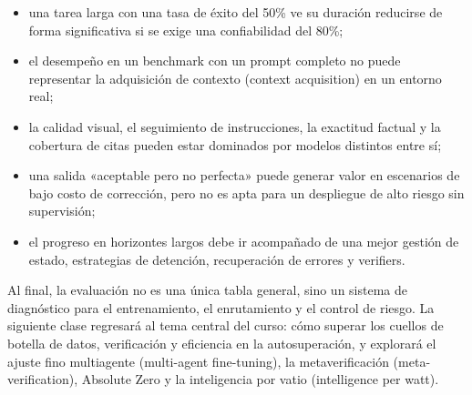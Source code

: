 \documentclass[a4paper]{article}
\begin{document}
\begin{itemize}
    \item una tarea larga con una tasa de éxito del 50\% ve su duración reducirse de forma significativa si se exige una confiabilidad del 80\%;
    \item el desempeño en un benchmark con un prompt completo no puede representar la adquisición de contexto (context acquisition) en un entorno real;
    \item la calidad visual, el seguimiento de instrucciones, la exactitud factual y la cobertura de citas pueden estar dominados por modelos distintos entre sí;
    \item una salida «aceptable pero no perfecta» puede generar valor en escenarios de bajo costo de corrección, pero no es apta para un despliegue de alto riesgo sin supervisión;
    \item el progreso en horizontes largos debe ir acompañado de una mejor gestión de estado, estrategias de detención, recuperación de errores y verifiers.
\end{itemize}

Al final, la evaluación no es una única tabla general, sino un sistema de diagnóstico para el entrenamiento, el enrutamiento y el control de riesgo. La siguiente clase regresará al tema central del curso: cómo superar los cuellos de botella de datos, verificación y eficiencia en la autosuperación, y explorará el ajuste fino multiagente (multi-agent fine-tuning), la metaverificación (meta-verification), Absolute Zero y la inteligencia por vatio (intelligence per watt).
\end{document}
